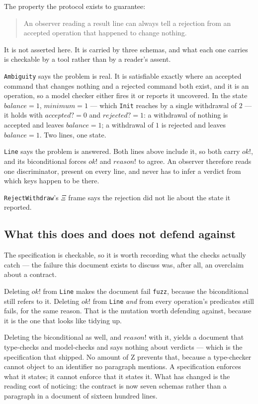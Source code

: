 \documentclass[a4paper,10pt,fleqn]{article}
\begin{document}
The property the protocol exists to guarantee:

\begin{quote}
  An observer reading a result line can always tell a rejection from an
  accepted operation that happened to change nothing.
\end{quote}

It is not asserted here. It is carried by three schemas, and what each
one carries is checkable by a tool rather than by a reader's assent.

\texttt{Ambiguity} says the problem is real. It is satisfiable exactly
where an accepted command that changes nothing and a rejected command
both exist, and it is an operation, so a model checker either fires it or
reports it uncovered. In the state $balance = 1$, $minimum = 1$ --- which
\texttt{Init} reaches by a single withdrawal of $2$ --- it holds with
$accepted? = 0$ and $rejected? = 1$: a withdrawal of nothing is accepted
and leaves $balance = 1$; a withdrawal of $1$ is rejected and leaves
$balance = 1$. Two lines, one state.

\texttt{Line} says the problem is answered. Both lines above include it,
so both carry $ok!$, and its biconditional forces $ok!$ and $reason!$ to
agree. An observer therefore reads one discriminator, present on every
line, and never has to infer a verdict from which keys happen to be
there.

\texttt{RejectWithdraw}'s $\Xi$ frame says the rejection did not lie
about the state it reported.

\subsection{What this does and does not defend against}

The specification is checkable, so it is worth recording what the checks
actually catch --- the failure this document exists to discuss was, after
all, an overclaim about a contract.

Deleting $ok!$ from \texttt{Line} makes the document fail
\texttt{fuzz}, because the biconditional still refers to it. Deleting
$ok!$ from \texttt{Line} \emph{and} from every operation's predicates
still fails, for the same reason. That is the mutation worth defending
against, because it is the one that looks like tidying up.

Deleting the biconditional as well, and $reason!$ with it, yields a
document that type-checks and model-checks and says nothing about
verdicts --- which is the specification that shipped. No amount of Z
prevents that, because a type-checker cannot object to an identifier no
paragraph mentions. A specification enforces what it states; it cannot
enforce that it states it. What has changed is the reading cost of
noticing: the contract is now seven schemas rather than a paragraph in a
document of sixteen hundred lines.
\end{document}
